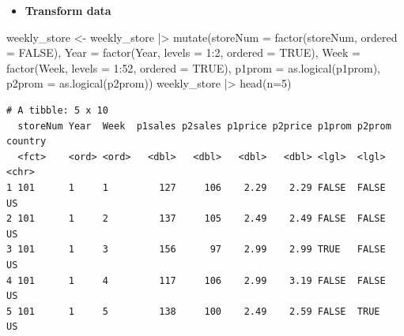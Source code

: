 \documentclass[
  ignorenonframetext,
]{beamer}
\newenvironment{Shaded}{\begin{snugshade}}{\end{snugshade}}
\newcommand{\AttributeTok}[1]{\textcolor[rgb]{0.40,0.45,0.13}{#1}}
\newcommand{\ConstantTok}[1]{\textcolor[rgb]{0.56,0.35,0.01}{#1}}
\newcommand{\DecValTok}[1]{\textcolor[rgb]{0.68,0.00,0.00}{#1}}
\newcommand{\FunctionTok}[1]{\textcolor[rgb]{0.28,0.35,0.67}{#1}}
\newcommand{\NormalTok}[1]{\textcolor[rgb]{0.00,0.23,0.31}{#1}}
\newcommand{\OtherTok}[1]{\textcolor[rgb]{0.00,0.23,0.31}{#1}}
\newcommand{\SpecialCharTok}[1]{\textcolor[rgb]{0.37,0.37,0.37}{#1}}
\providecommand{\tightlist}{%
  \setlength{\itemsep}{0pt}\setlength{\parskip}{0pt}}\usepackage{longtable,booktabs,array}
\begin{document}
\begin{frame}[fragile]{}
\label{section-4}
\begin{itemize}
\tightlist
\item
  \textbf{Transform data}
\end{itemize}

\tiny

\begin{Shaded}
\begin{Highlighting}[]
\NormalTok{weekly\_store }\OtherTok{\textless{}{-}}\NormalTok{ weekly\_store }\SpecialCharTok{|\textgreater{}}
  \FunctionTok{mutate}\NormalTok{(}\AttributeTok{storeNum =} \FunctionTok{factor}\NormalTok{(storeNum, }\AttributeTok{ordered =} \ConstantTok{FALSE}\NormalTok{),}
         \AttributeTok{Year =} \FunctionTok{factor}\NormalTok{(Year, }\AttributeTok{levels =} \DecValTok{1}\SpecialCharTok{:}\DecValTok{2}\NormalTok{, }\AttributeTok{ordered =} \ConstantTok{TRUE}\NormalTok{),}
         \AttributeTok{Week =} \FunctionTok{factor}\NormalTok{(Week, }\AttributeTok{levels =} \DecValTok{1}\SpecialCharTok{:}\DecValTok{52}\NormalTok{, }\AttributeTok{ordered =} \ConstantTok{TRUE}\NormalTok{),}
         \AttributeTok{p1prom =} \FunctionTok{as.logical}\NormalTok{(p1prom),}
         \AttributeTok{p2prom =} \FunctionTok{as.logical}\NormalTok{(p2prom))}
\NormalTok{weekly\_store }\SpecialCharTok{|\textgreater{}} \FunctionTok{head}\NormalTok{(}\AttributeTok{n=}\DecValTok{5}\NormalTok{)}
\end{Highlighting}
\end{Shaded}

\begin{verbatim}
# A tibble: 5 x 10
  storeNum Year  Week  p1sales p2sales p1price p2price p1prom p2prom country
  <fct>    <ord> <ord>   <dbl>   <dbl>   <dbl>   <dbl> <lgl>  <lgl>  <chr>  
1 101      1     1         127     106    2.29    2.29 FALSE  FALSE  US     
2 101      1     2         137     105    2.49    2.49 FALSE  FALSE  US     
3 101      1     3         156      97    2.99    2.99 TRUE   FALSE  US     
4 101      1     4         117     106    2.99    3.19 FALSE  FALSE  US     
5 101      1     5         138     100    2.49    2.59 FALSE  TRUE   US     
\end{verbatim}
\end{frame}
\end{document}
